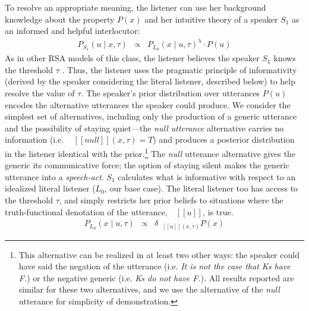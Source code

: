 \documentclass[12pt,letterpaper]{article}
\newcommand{\denote}[1]{\mbox{ $[\![ #1 ]\!]$}}
\begin{document}
To resolve an appropriate meaning, the listener can use her background knowledge about the property $P(x)$ and her intuitive theory of a speaker $S_1$ as an informed and helpful interlocutor:
\begin{eqnarray}
P_{S_{1}}(u \mid x, \tau) &\propto&  {P_{L_{0}}(x \mid u, \tau)}^{\lambda} \cdot P(u) \label{eq:S1}
\end{eqnarray}
%
As in other RSA models of this class, the listener believes the speaker $S_1$ knows the threshold $\tau$ \cite{Lassiter2013, Lassiter2015, GoodmanLassiter}.
Thus, the listener uses the pragmatic principle of informativity (derived by the speaker considering the literal listener, described below) to help resolve the value of $\tau$. 
The speaker's prior distribution over utterances $P(u)$ encodes the alternative utterances the speaker could produce. 
We consider the simplest set of alternatives, including only the production of a generic utterance and the possibility of staying quiet---the \emph{null utterance} alternative carries no information (i.e.~$\denote{null}(x, \tau)=T$) and produces a posterior distribution in the listener identical with the prior.\footnote{
This alternative can be realized in at least two other ways: the speaker could have said the negation of the utterance (i.e. \emph{It is not the case that Ks have F.}) or the negative generic (i.e. \emph{Ks do not have F.}). All results reported are similar for these two alternatives, and we use the alternative of the \emph{null} utterance for simplicity of demonstration.
}
The \emph{null} utterance alternative gives the generic its communicative force; the option of staying silent makes the generic utterance into a \emph{speech-act}.
%
%
%
$S_1$ calculates what is informative with respect to an idealized literal listener ($L_{0}$, our base case).
The literal listener too has access to the threshold $\tau$, and simply restricts her prior beliefs to situations where the truth-functional denotation of the utterance, $\denote{u}$, is true.
%
\begin{eqnarray}
P_{L_{0}}(x \mid u, \tau) &\propto& {\delta_{\denote{u}(x, \tau)} P(x)} \label{eq:L0}
\end{eqnarray}
%
\end{document}
